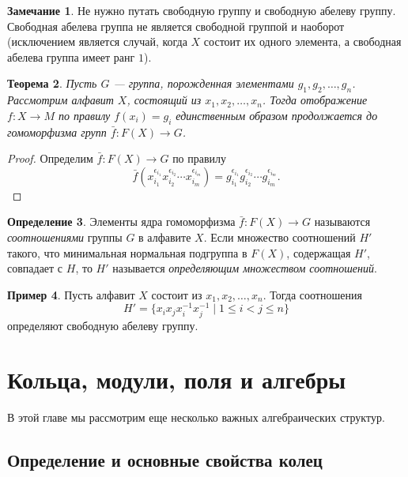 \documentclass[12pt, titlepage, oneside]{amsbook}
\newtheorem{theorem}{Теорема}[chapter]
\theoremstyle{definition}
\newtheorem{example}[theorem]{Пример}
\newtheorem{definition}[theorem]{Определение}
\newtheorem{remark}[theorem]{Замечание}
\theoremstyle{remark}
\begin{document}
\begin{remark}
	Не нужно путать свободную группу и свободную абелеву группу. Свободная абелева группа не является свободной группой и наоборот (исключением является случай, когда $X$ состоит их одного элемента, а свободная абелева группа имеет ранг $1$).
\end{remark}

\begin{theorem}
	\label{SvGr7} Пусть $G$ --- группа, порожденная элементами $g_1,g_2,\ldots, g_n$. Рассмотрим алфавит $X$, состоящий из $x_1,x_2,\ldots,x_n$. Тогда отображение $f\colon X\rightarrow M$ по правилу $f(x_i)=g_i$ единственным образом продолжается до гомоморфизма групп $\bar{f}\colon F(X)\rightarrow G$.
\end{theorem}

\begin{proof}
	Определим $\bar{f}\colon F(X)\rightarrow G$ по правилу $$\bar{f}(x^{\epsilon_{i_1}}_{i_1}x^{\epsilon_{i_2}}_{i_2}\cdots x^{\epsilon_{i_m}}_{i_m})=g^{\epsilon_{i_1}}_{i_1}g^{\epsilon_{i_2}}_{i_2}\cdots g^{\epsilon_{i_m}}_{i_m}.$$
\end{proof}

\begin{definition}
	Элементы ядра гомоморфизма $\bar{f}\colon F(X)\rightarrow G$ называются \emph{соотношениями} группы $G$ в алфавите $X$. Если множество соотношений $H'$ такого, что минимальная нормальная подгруппа в $F(X)$, содержащая $H'$, совпадает с $H$, то $H'$ называется \emph{определяющим множеством соотношений}.
\end{definition}

\begin{example}
	Пусть алфавит $X$ состоит из $x_1,x_2,\ldots,x_n$. Тогда соотношения $$H'=\{x_ix_jx^{-1}_ix^{-1}_j\mid 1\leq i<j\leq n\}$$ определяют свободную абелеву группу.
\end{example}



\chapter{Кольца, модули, поля и алгебры}

В этой главе мы рассмотрим еще несколько важных алгебраических структур.

\section{Определение и основные свойства колец}
\end{document}
